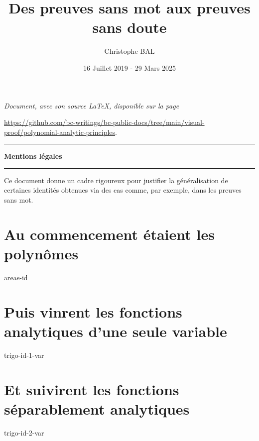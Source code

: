 \documentclass[12pt]{amsart}
\begin{document}
\title{Des preuves sans mot aux preuves sans doute}
\author{Christophe BAL}
\date{16 Juillet 2019 - 29 Mars 2025}

\maketitle

\begin{center}
	\itshape
	Document, avec son source \LaTeX, disponible sur la page

	\url{https://github.com/bc-writings/bc-public-docs/tree/main/visual-proof/polynomial-analytic-principles}.
\end{center}


\bigskip


\begin{center}
	\hrule\vspace{.3em}
	{
		\fontsize{1.35em}{1em}\selectfont
		\textbf{Mentions \og légales \fg}
	}

	\vspace{0.45em}
	\doclicenseThis
	\hrule
\end{center}


\bigskip


\setcounter{tocdepth}{1}
\tableofcontents



\newpage

\begin{meta-abstract*}
	Ce document donne un cadre rigoureux pour justifier la généralisation de certaines identités obtenues via des cas  comme, par exemple, dans les preuves sans mot. 
\end{meta-abstract*}




\section{Au commencement étaient les polynômes}

{areas-id}




\newpage
\section{Puis vinrent les fonctions analytiques d'une seule variable}

{trigo-id-1-var}




\newpage
\section{Et suivirent les fonctions séparablement analytiques}

{trigo-id-2-var}
\end{document}
